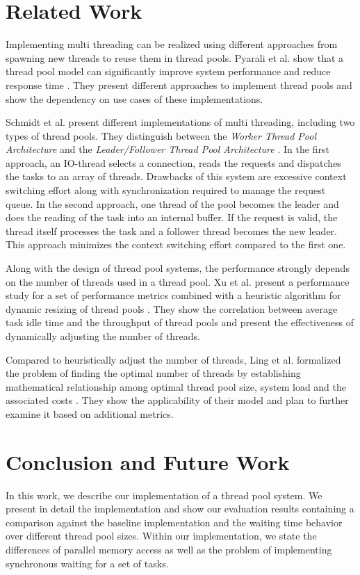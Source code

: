 \documentclass[conference]{IEEEtran}
\begin{document}
\section{Related Work}\label{sec:related}
Implementing multi threading can be realized using different approaches from spawning new threads to reuse them in thread pools. Pyarali et al. show that a thread pool model can significantly improve system performance and reduce response time \cite{pyarali2001evaluating}. They present different approaches to implement thread pools and show the dependency on use cases of these implementations.

Schmidt et al. present different implementations of multi threading, including two types of thread pools. They distinguish between the \emph{Worker Thread Pool Architecture} and the \emph{Leader/Follower Thread Pool Architecture} \cite{schmidt1998evaluating}. In the first approach, an IO-thread selects a connection, reads the requests and dispatches the tasks to an array of threads. Drawbacks of this system are excessive context switching effort along with synchronization required to manage the request queue. In the second approach, one thread of the pool becomes the leader and does the reading of the task into an internal buffer. If the request is valid, the thread itself processes the task and a follower thread becomes the new leader. This approach minimizes the context switching effort compared to the first one.

Along with the design of thread pool systems, the performance strongly depends on the number of threads used in a thread pool. Xu et al. present a performance study for a set of performance metrics combined with a heuristic algorithm for dynamic resizing of thread pools \cite{xu2004performance}. They show the correlation between average task idle time and the throughput of thread pools and present the effectiveness of dynamically adjusting the number of threads.

Compared to heuristically adjust the number of threads, Ling et al. formalized the problem of finding the optimal number of threads by establishing mathematical relationship among optimal thread pool size, system load and the associated costs \cite{ling2000analysis}. They show the applicability of their model and plan to further examine it based on additional metrics.

\section{Conclusion and Future Work}\label{sec:future}
In this work, we describe our implementation of a thread pool system. We present in detail the implementation and show our evaluation results containing a comparison against the baseline implementation and the waiting time behavior over different thread pool sizes. Within our implementation, we state the differences of parallel memory access as well as the problem of implementing synchronous waiting for a set of tasks.
\end{document}
